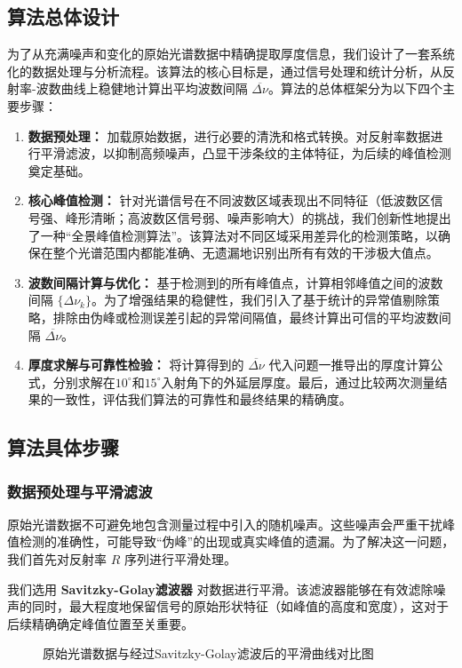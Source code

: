 \documentclass[withoutpreface,bwprint]{cumcmthesis} %
\begin{document}
\subsection{算法总体设计}
为了从充满噪声和变化的原始光谱数据中精确提取厚度信息，我们设计了一套系统化的数据处理与分析流程。该算法的核心目标是，通过信号处理和统计分析，从反射率-波数曲线上稳健地计算出平均波数间隔 $\overline{\Delta\nu}$。算法的总体框架分为以下四个主要步骤：
\begin{enumerate}
    \item \textbf{数据预处理：} 加载原始数据，进行必要的清洗和格式转换。对反射率数据进行平滑滤波，以抑制高频噪声，凸显干涉条纹的主体特征，为后续的峰值检测奠定基础。
    \item \textbf{核心峰值检测：} 针对光谱信号在不同波数区域表现出不同特征（低波数区信号强、峰形清晰；高波数区信号弱、噪声影响大）的挑战，我们创新性地提出了一种“全景峰值检测算法”。该算法对不同区域采用差异化的检测策略，以确保在整个光谱范围内都能准确、无遗漏地识别出所有有效的干涉极大值点。
    \item \textbf{波数间隔计算与优化：} 基于检测到的所有峰值点，计算相邻峰值之间的波数间隔 $\{\Delta\nu_k\}$。为了增强结果的稳健性，我们引入了基于统计的异常值剔除策略，排除由伪峰或检测误差引起的异常间隔值，最终计算出可信的平均波数间隔 $\overline{\Delta\nu}$。
    \item \textbf{厚度求解与可靠性检验：} 将计算得到的 $\overline{\Delta\nu}$ 代入问题一推导出的厚度计算公式，分别求解在$10^\circ$和$15^\circ$入射角下的外延层厚度。最后，通过比较两次测量结果的一致性，评估我们算法的可靠性和最终结果的精确度。
\end{enumerate}

\subsection{算法具体步骤}

\subsubsection{数据预处理与平滑滤波}
原始光谱数据不可避免地包含测量过程中引入的随机噪声。这些噪声会严重干扰峰值检测的准确性，可能导致“伪峰”的出现或真实峰值的遗漏。为了解决这一问题，我们首先对反射率 $R$ 序列进行平滑处理。

我们选用 \textbf{Savitzky-Golay滤波器} 对数据进行平滑。该滤波器能够在有效滤除噪声的同时，最大程度地保留信号的原始形状特征（如峰值的高度和宽度），这对于后续精确确定峰值位置至关重要。

\begin{figure}[htbp]
    \centering
    \caption{原始光谱数据与经过Savitzky-Golay滤波后的平滑曲线对比图}
    \label{fig:smoothing}
\end{figure}
\end{document}

